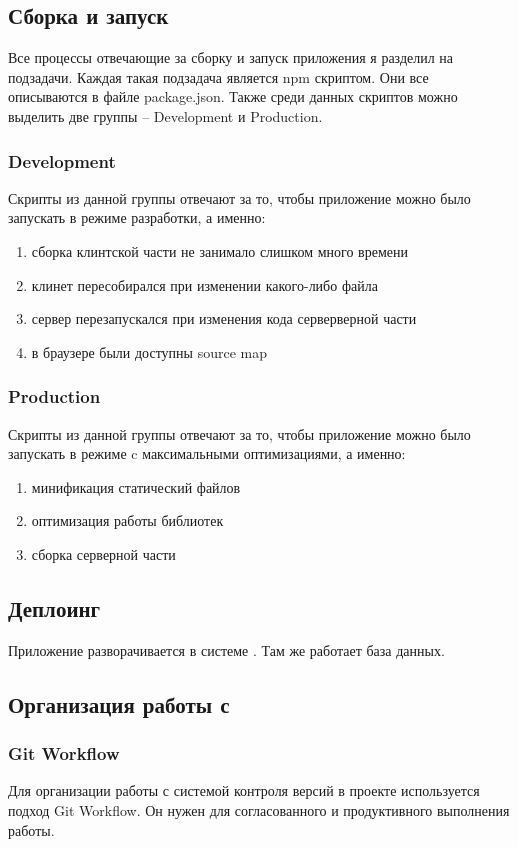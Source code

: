 \subsection{Сборка и запуск}
Все процессы отвечающие за сборку и запуск приложения я разделил на подзадачи. Каждая такая подзадача является npm скриптом. Они все описываются в файле package.json. Также среди данных скриптов можно выделить две группы -- Development и Production.

\subsubsection{Development}
Скрипты из данной группы отвечают за то, чтобы приложение можно было запускать в режиме разработки, а именно:
\begin{enumerate}
    \item сборка клинтской части не занимало слишком много времени
    \item клинет пересобирался при изменении какого-либо файла
    \item сервер перезапускался при изменения кода серверверной части
    \item в браузере были доступны source map
\end{enumerate}

\subsubsection{Production}
Скрипты из данной группы отвечают за то, чтобы приложение можно было запускать в режиме c максимальными оптимизациями, а именно:
\begin{enumerate}
    \item минификация статический файлов
    \item оптимизация работы библиотек
    \item сборка серверной части
\end{enumerate}

\subsection{Деплоинг}
Приложение разворачивается в системе \textcite{heroku}. Там же работает база данных.

\subsection{Организация работы с \textcite{git}}
\subsubsection{Git Workflow}
Для организации работы с системой контроля версий в проекте используется подход Git Workflow. Он нужен для согласованного и продуктивного выполнения работы.

